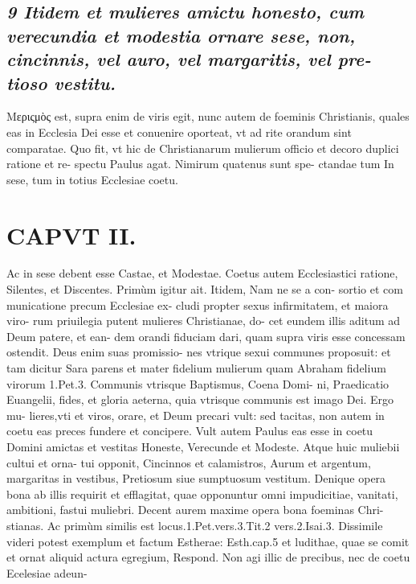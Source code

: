 \documentclass{article}
\begin{document}
\begin{pages}
\subsection*{\textit{9 Itidem et mulieres amictu honesto, cum verecundia et modestia ornare sese, non, cincinnis, vel auro, vel margaritis, vel pre- tioso vestitu. }}\pstart Μεριςμὸς est, supra enim de viris egit, nunc autem de foeminis Christianis, quales eas in Ecclesia Dei esse et conuenire oporteat, vt ad rite orandum sint comparatae. Quo fit, vt hic de Christianarum mulierum officio et decoro duplici ratione et re- spectu Paulus agat. Nimirum quatenus sunt spe- ctandae tum In sese, tum in totius Ecclesiae coetu.  \pend
\section*{CAPVT II. }
\marginpar{[ p.77 ]}\pstart Ac in sese debent esse Castae, et Modestae. Coetus autem Ecclesiastici ratione, Silentes, et Discentes.  \pend\pstart Primùm igitur ait. Itidem, Nam ne se a con- sortio et com municatione precum Ecclesiae ex- cludi propter sexus infirmitatem, et maiora viro- rum priuilegia putent mulieres Christianae, do- cet eundem illis aditum ad Deum patere, et ean- dem orandi fiduciam dari, quam supra viris esse concessam ostendit. Deus enim suas promissio- nes vtrique sexui communes proposuit: et tam dicitur Sara parens et mater fidelium mulierum quam Abraham fidelium virorum 1.Pet.3.  \pend\pstart Communis vtrisque Baptismus, Coena Domi- ni, Praedicatio Euangelii, fides, et gloria aeterna, quia vtrisque communis est imago Dei. Ergo mu- lieres,vti et viros, orare, et Deum precari vult: sed tacitas, non autem in coetu eas preces fundere et concipere. Vult autem Paulus eas esse in coetu Domini amictas et vestitas Honeste, Verecunde et Modeste. Atque huic muliebii cultui et orna- tui opponit, Cincinnos et calamistros, Aurum et argentum, margaritas in vestibus, Pretiosum siue sumptuosum vestitum. Denique opera bona ab illis requirit et efflagitat, quae opponuntur omni impudicitiae, vanitati, ambitioni, fastui muliebri. Decent aurem maxime opera bona foeminas Chri- stianas.  \pend\pstart Ac primùm similis est locus.1.Pet.vers.3.Tit.2 vers.2.Isai.3.  \pend\pstart Dissimile videri potest exemplum et factum Estherae: Esth.cap.5 et ludithae, quae se comit et ornat aliquid actura egregium, Respond. Non agi illic de precibus, nec de coetu Ecelesiae adeun-  \pend

\end{pages}
\end{document}

